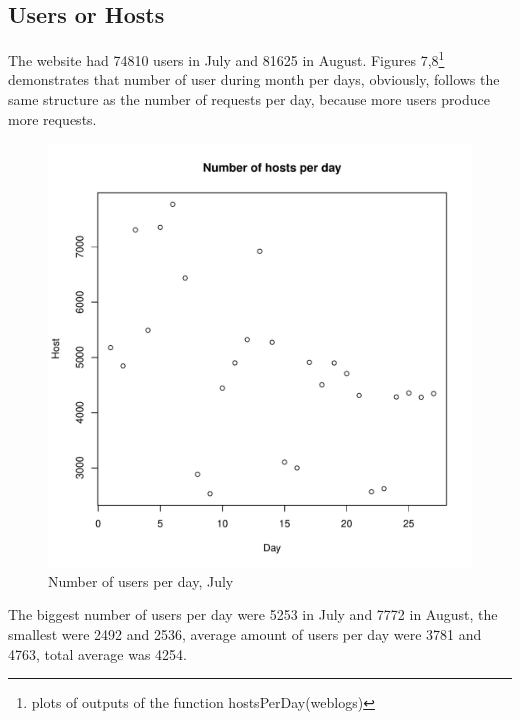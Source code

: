 \documentclass[english]{article}
\begin{document}
\subsection{Users or Hosts}
The website had 74810 users in July and 81625 in August. Figures 7,8\footnote{plots of outputs of the function hostsPerDay(weblogs)} demonstrates that number of user during month per days, obviously, follows the same structure as the number of requests per day, because more users produce more requests.
\begin{figure}[H]
\centerline{\includegraphics{Weblogs/Jul/NumberOfHostsPerDay.pdf}}
\caption{Number of users per day, July}
\end{figure}
The biggest number of users per day were 5253 in July and 7772 in August, the smallest were 2492 and 2536, average amount of users per day were 3781 and 4763, total average was 4254.
\end{document}
